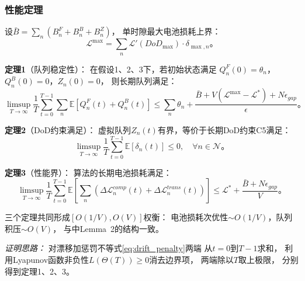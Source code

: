 \documentclass[a4paper,11pt]{article}
\begin{document}
\subsubsection{性能定理}

设$\bar{B} = \sum_n(B^F_n + B^B_n + B^Z_n)$，
单时隙最大电池损耗上界：
\begin{equation}
\mathcal{L}^{\max} = \sum_n
\mathcal{L}'(DoD_{\max}) \cdot \delta_{\max,n}。
\label{eq:L_max}
\end{equation}

\textbf{定理1}（队列稳定性）：
在假设1、2、3下，若初始状态满足
$Q^F_n(0) = \theta_n$，$Q^B_n(0) = 0$，$Z_n(0) = 0$，
则长期队列满足：
\begin{equation}
\limsup_{T\to\infty}\frac{1}{T}\sum_{t=0}^{T-1}
\sum_n\mathbb{E}\left[Q^F_n(t) + Q^B_n(t)\right]
\leq \sum_n\theta_n
+ \frac{\bar{B} + V(\mathcal{L}^{\max} - \mathcal{L}^*)
+ N\epsilon_{gap}}{\epsilon}。
\label{eq:thm1}
\end{equation}

\textbf{定理2}（DoD约束满足）：
虚拟队列$Z_n(t)$有界，等价于长期DoD约束C5满足：
\begin{equation}
\limsup_{T\to\infty}\frac{1}{T}\sum_{t=0}^{T-1}
\mathbb{E}[\delta_n(t)] \leq 0,
\quad \forall n \in \mathcal{N}。
\label{eq:thm2}
\end{equation}

\textbf{定理3}（性能界）：
算法的长期电池损耗满足：
\begin{equation}
\limsup_{T\to\infty}\frac{1}{T}\sum_{t=0}^{T-1}
\mathbb{E}\left[\sum_n(\Delta\mathcal{L}^{comp}_n(t)
+ \Delta\mathcal{L}^{trans}_n(t))\right]
\leq \mathcal{L}^* + \frac{\bar{B} + N\epsilon_{gap}}{V}。
\label{eq:thm3}
\end{equation}

三个定理共同形成$[O(1/V), O(V)]$权衡：
电池损耗次优性$\sim O(1/V)$，队列积压$\sim O(V)$，
与\cite{zhang2024mhspo}中Lemma~2的结构一致。

\textit{证明思路：}
对漂移加惩罚不等式\eqref{eq:drift_penalty}两端
从$t=0$到$T-1$求和，
利用Lyapunov函数非负性$L(\Theta(T)) \geq 0$消去边界项，
两端除以$T$取上极限，
分别得到定理1、2、3。


\end{document}
